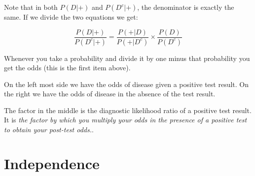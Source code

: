 \documentclass[]{article}
\begin{document}
Note that in both \(P(D|+)\) and \(P(D^c|+)\), the denominator is
exactly the same. If we divide the two equations we get:

\[ \frac{ P(D|+) }{ P(D^c|+) } = \frac{ P(+|D) }{ P(+|D^c) } \times \frac{ P(D) }{ P(D^c) }\]

Whenever you take a probability and divide it by one minus that
probability you get the odds (this is the first item above).

On the left most side we have the odds of disease given a positive test
result. On the right we have the odds of disease in the absence of the
test result.

The factor in the middle is the diagnostic likelihood ratio of a
positive test result. It is \emph{the factor by which you multiply your
odds in the presence of a positive test to obtain your post-test odds.}.

\hypertarget{independence}{%
\section{Independence}\label{independence}}
\end{document}

